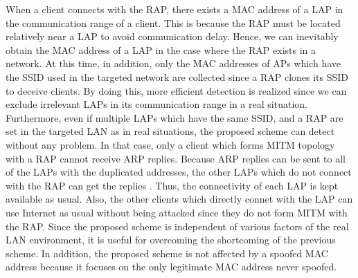 \documentclass[conference]{IEEEtran}
\begin{document}
When a client connects with the RAP, there exists a MAC address of a LAP in the communication range of a client.
This is because the RAP must be located relatively near a LAP to avoid communication delay.
Hence, we can inevitably obtain the MAC address of a LAP in the case where the RAP exists in a network.
At this time, in addition, only the MAC addresses of APs which have the SSID used in the targeted network are collected since a RAP clones its SSID to deceive clients.
By doing this, more efficient detection is realized since we can exclude irrelevant LAPs in its communication range in a real situation.
Furthermore, even if multiple LAPs which have the same SSID, and a RAP are set in the targeted LAN as in real situations, the proposed scheme can detect without any problem.
In that case, only a client which forms MITM topology with a RAP cannot receive ARP replies.
Because ARP replies can be sent to all of the LAPs with the duplicated addresses, the other LAPs which do not connect with the RAP can get the replies \cite{kataoka}.
Thus, the connectivity of each LAP is kept available as usual.
Also, the other clients which directly connet with the LAP can use Internet as usual without being attacked since they do not form MITM with the RAP.
Since the proposed scheme is independent of various factors of the real LAN environment, it is useful for overcoming the shortcoming of the previous scheme.
In addition, the proposed scheme is not affected by a spoofed MAC address because it focuses on the only legitimate MAC address never spoofed.
\end{document}
